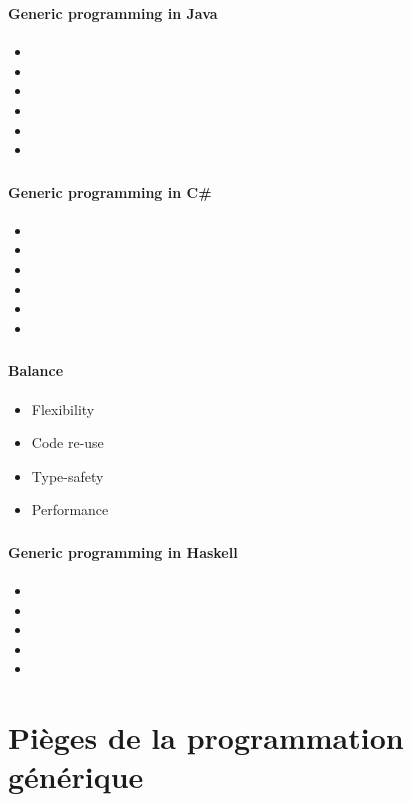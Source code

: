 \documentclass[draft]{beamer}
\begin{document}
\begin{frame}
\frametitle{\cite{giovannelli_programming_2013}}
\framesubtitle{Generic programming in Java}
\begin{itemize}
 \item 
 \item 
 \item 
 \item 
 \item 
 \item 
\end{itemize}
\end{frame}

\begin{frame}
\frametitle{\cite{giovannelli_programming_2013}}
\framesubtitle{Generic programming in C\#}
\begin{itemize}
 \item 
 \item 
 \item 
 \item 
 \item 
 \item 
\end{itemize}
\end{frame}

\begin{frame}
\frametitle{\cite{giovannelli_programming_2013}}
\framesubtitle{Balance}
\begin{itemize}
 \item Flexibility
 \item Code re-use
 \item Type-safety
 \item Performance
\end{itemize}
\end{frame}

\begin{frame}
\frametitle{\cite{giovannelli_programming_2013}}
\framesubtitle{Generic programming in Haskell}
\begin{itemize}
 \item 
 \item 
 \item 
 \item 
 \item 
\end{itemize}
\end{frame}

\section{Pièges de la programmation générique}
\end{document}
